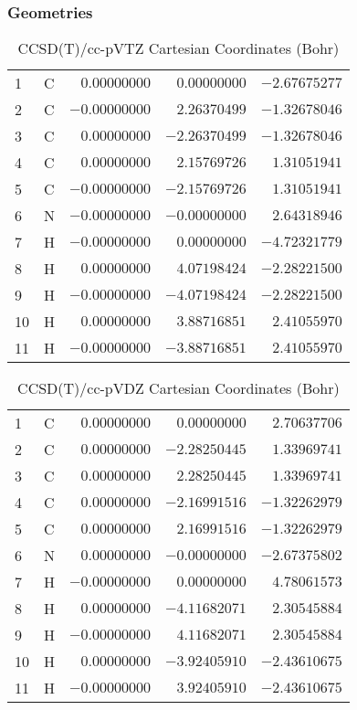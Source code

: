 \documentclass[10pt,oneside]{article}
\begin{document}
\clearpage

\subsection{\ \ \ }

\subsubsection*{Geometries}
\begin{table}[h!]
\centering
\caption{CCSD(T)/cc-pVTZ Cartesian Coordinates (Bohr)}
\begin{tabular}{llrrr}
1  & C  & $ 0.00000000$ & $ 0.00000000$ & $-2.67675277$ \\
2  & C  & $-0.00000000$ & $ 2.26370499$ & $-1.32678046$ \\
3  & C  & $ 0.00000000$ & $-2.26370499$ & $-1.32678046$ \\
4  & C  & $ 0.00000000$ & $ 2.15769726$ & $ 1.31051941$ \\
5  & C  & $-0.00000000$ & $-2.15769726$ & $ 1.31051941$ \\
6  & N  & $-0.00000000$ & $-0.00000000$ & $ 2.64318946$ \\
7  & H  & $-0.00000000$ & $ 0.00000000$ & $-4.72321779$ \\
8  & H  & $ 0.00000000$ & $ 4.07198424$ & $-2.28221500$ \\
9  & H  & $-0.00000000$ & $-4.07198424$ & $-2.28221500$ \\
10 & H  & $ 0.00000000$ & $ 3.88716851$ & $ 2.41055970$ \\
11 & H  & $-0.00000000$ & $-3.88716851$ & $ 2.41055970$ \\
\end{tabular}
\end{table}

\begin{table}[h!]
\centering
\caption{CCSD(T)/cc-pVDZ Cartesian Coordinates (Bohr)}
\begin{tabular}{llrrr}
1  & C  & $ 0.00000000$ & $ 0.00000000$ & $ 2.70637706$ \\
2  & C  & $ 0.00000000$ & $-2.28250445$ & $ 1.33969741$ \\
3  & C  & $ 0.00000000$ & $ 2.28250445$ & $ 1.33969741$ \\
4  & C  & $ 0.00000000$ & $-2.16991516$ & $-1.32262979$ \\
5  & C  & $ 0.00000000$ & $ 2.16991516$ & $-1.32262979$ \\
6  & N  & $ 0.00000000$ & $-0.00000000$ & $-2.67375802$ \\
7  & H  & $-0.00000000$ & $ 0.00000000$ & $ 4.78061573$ \\
8  & H  & $ 0.00000000$ & $-4.11682071$ & $ 2.30545884$ \\
9  & H  & $-0.00000000$ & $ 4.11682071$ & $ 2.30545884$ \\
10 & H  & $ 0.00000000$ & $-3.92405910$ & $-2.43610675$ \\
11 & H  & $-0.00000000$ & $ 3.92405910$ & $-2.43610675$ \\
\end{tabular}
\end{table}
\end{document}
